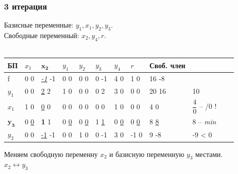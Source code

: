 \documentclass[14pt,a4paper,fleqn]{extarticle}
\begin{document}
\subsubsection*{3 итерация}
Базисные переменные: $y_1, x_1, y_2, y_3$.\\
Свободные переменный: $x_2, y_4, r$.\\\\
\begin{tabularx}{\textwidth}{|p{1cm}|p{1cm}V{7}p{1cm}V{6}p{1cm}|p{1cm}|p{1cm}|p{1cm}|p{1cm}|p{1.2cm}|c}
	\hline
	БП & $x_1$ & $\boldsymbol{x_2}$ & $y_1$ & $y_2$ & $y_3$ & $y_4$ & $r$ & Своб. член & \\
	\hline
	
	f & 0 \scriptsize 0 & \underline{\textit{-1}} \scriptsize -1 & 0 \scriptsize 0 & 0 \scriptsize 0 & 0 \scriptsize -1 & 4 \scriptsize 0 & 1 \scriptsize 0 & 16 \scriptsize -8 & \\
	
	\hline
	
	$y_1$ & 0 \scriptsize 0 & \underline{2} \scriptsize 2 & 1 \scriptsize 0 & 0 \scriptsize 0 & 0 \scriptsize 2 & 3 \scriptsize 0 & 0 \scriptsize 0 & 20 \scriptsize 16 & 10 \\
	
	\hline
	
	$x_1$ & 1 \scriptsize 0 & \underline{0} \scriptsize 0 & 0 \scriptsize 0 & 0 \scriptsize 0 & 0 \scriptsize 0 & 1 \scriptsize 0 & 0 \scriptsize 0 & 4 \scriptsize 0 & $\dfrac{4}{0}$ -- /0 ! \\
	
	\Xhline{6\arrayrulewidth}
	$\boldsymbol{y_3}$ & 0 \scriptsize \underline 0 & \textbf{1} \scriptsize 1 & 0 \scriptsize \underline 0 & 0 \scriptsize \underline 0 & 1 \scriptsize \underline 1 & 0 \scriptsize \underline 0 & 0 \scriptsize \underline 0 & 8 \scriptsize \underline 8 & 8 -- \textit{min} \\
	\Xhline{6\arrayrulewidth}
	
	$y_2$ & 0 \scriptsize 0 & \underline{-1} \scriptsize -1 & 0 \scriptsize 0 & 1 \scriptsize 0 & 0 \scriptsize -1 & 3 \scriptsize 0 & -1 \scriptsize 0 & 9 \scriptsize -8 & -9 < 0 \\
	\hline
\end{tabularx}
\newline\newline
Меняем свободную переменну $x_2$ и базисную переменную $y_3$ местами.\\
$x_2 \leftrightarrow y_3$
\end{document}
